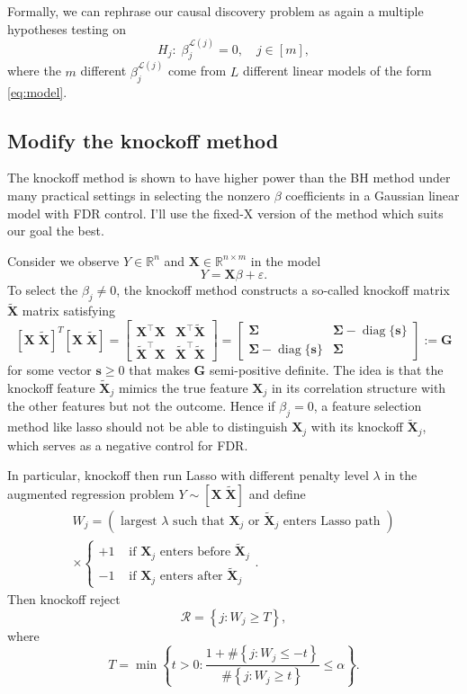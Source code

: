 \documentclass[11pt]{article}
\newcommand{\cR}{\mathcal{R}}
\newcommand{\cL}{\mathcal{L}}
\newcommand{\RR}{\mathbb{R}}
\newcommand{\ep}{\varepsilon}
\newcommand{\tX}{\tilde{\mat X}}
\newcommand{\br}[1]{\left[ #1 \right]}
\newcommand{\vct}[1]{\boldsymbol{#1}}
\newcommand{\mat}[1]{\boldsymbol{#1}}
\begin{document}
Formally, we can rephrase our causal discovery problem as again a multiple hypotheses testing on
\[ H_j: \; \beta^{\cL(j)}_j = 0, \quad j \in [m], \]
where the $m$ different $\beta^{\cL(j)}_j$ come from $L$ different linear models of the form \eqref{eq:model}.

\subsection{Modify the knockoff method}%
\label{sub:the_knockoff_method}

The knockoff method \citep{barber15, candes2018panning} is shown to have higher power than the BH method under many practical settings in selecting the nonzero $\beta$ coefficients in a Gaussian linear model with FDR control. I'll use the fixed-X version of the method which suits our goal the best.

Consider we observe $Y \in \RR^n$ and $\mat X \in \RR^{n \times m}$ in the model
\[ Y = \mat X \beta + \ep. \]
To select the $\beta_j \neq 0$, the knockoff method constructs a so-called knockoff matrix $\tX$ matrix satisfying
\[
\br{\mat X \; \tX}^T \br{\mat X \; \tX}
=\left[\begin{array}{cc}
\mathbf{X}^{\top} \mathbf{X} & \mathbf{X}^{\top} \tilde{\mathbf{X}} \\
\tilde{\mathbf{X}}^{\top} \mathbf{X} & \tilde{\mathbf{X}}^{\top} \tilde{\mathbf{X}}
\end{array}\right]=\left[\begin{array}{cc}
\boldsymbol{\Sigma} & \boldsymbol{\Sigma}-\operatorname{diag}\{\mathbf{s}\} \\
\boldsymbol{\Sigma}-\operatorname{diag}\{\mathbf{s}\} & \boldsymbol{\Sigma}
\end{array}\right] := \mathbf{G}
\]
for some vector $\vct s \geq 0$ that makes $\mat G$ semi-positive definite. The idea is that the knockoff feature $\tX_j$ mimics the true feature $\mat X_j$ in its correlation structure with the other features but not the outcome. Hence if $\beta_j = 0$, a feature selection method like lasso should not be able to distinguish $\mat X_j$ with its knockoff $\tX_j$, which serves as a negative control for FDR.

In particular, knockoff then run Lasso with different penalty level $\lambda$ in the augmented regression problem $Y \sim [\mat X \; \tX]$ and define
\begin{gather*}
    W_j = (\text { largest } \lambda \text { such that } \mathbf{X}_{j} \text { or } \tilde{\mathbf{X}}_{j} \text { enters Lasso path }) \\
    \times\left\{\begin{array}{ll}
+1 & \text { if } \mathbf{X}_{j} \text { enters before } \tilde{\mathbf{X}}_{j} \\
-1 & \text { if } \mathbf{X}_{j} \text { enters after } \tilde{\mathbf{X}}_{j}
\end{array}\right..
\end{gather*}
Then knockoff reject
\[\cR = \left\{j: W_{j} \geq T\right\},\]
where
\[ T = \min \left\{t>0: \frac{1+\#\left\{j: W_{j} \leq-t\right\}}{\#\left\{j: W_{j} \geq t\right\}} \leq \alpha \right\}. \]
\end{document}
